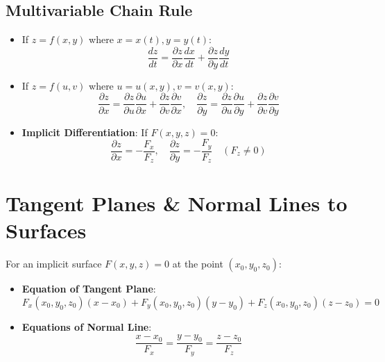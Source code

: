 \subsection{Multivariable Chain Rule}
\begin{itemize}[leftmargin=1.5em]
    \item If $z = f(x,y)$ where $x = x(t), y = y(t)$:
    \begin{equation}
        \frac{dz}{dt} = \frac{\partial z}{\partial x} \frac{dx}{dt} + \frac{\partial z}{\partial y} \frac{dy}{dt}
    \end{equation}
    \item If $z = f(u,v)$ where $u = u(x,y), v = v(x,y)$:
    \begin{equation}
        \frac{\partial z}{\partial x} = \frac{\partial z}{\partial u}\frac{\partial u}{\partial x} + \frac{\partial z}{\partial v}\frac{\partial v}{\partial x}, \quad \frac{\partial z}{\partial y} = \frac{\partial z}{\partial u}\frac{\partial u}{\partial y} + \frac{\partial z}{\partial v}\frac{\partial v}{\partial y}
    \end{equation}
    \item \textbf{Implicit Differentiation}: If $F(x,y,z) = 0$:
    \begin{equation}
        \frac{\partial z}{\partial x} = -\frac{F_x}{F_z}, \quad \frac{\partial z}{\partial y} = -\frac{F_y}{F_z} \quad (F_z \ne 0)
    \end{equation}
\end{itemize}

\section{Tangent Planes \& Normal Lines to Surfaces}

\begin{theorem}
For an implicit surface $F(x,y,z) = 0$ at the point $(x_0, y_0, z_0)$:
\begin{itemize}[leftmargin=1.5em]
    \item \textbf{Equation of Tangent Plane}:
    \begin{equation}
        F_x(x_0,y_0,z_0)(x - x_0) + F_y(x_0,y_0,z_0)(y - y_0) + F_z(x_0,y_0,z_0)(z - z_0) = 0
    \end{equation}
    \item \textbf{Equations of Normal Line}:
    \begin{equation}
        \frac{x - x_0}{F_x} = \frac{y - y_0}{F_y} = \frac{z - z_0}{F_z}
    \end{equation}
\end{itemize}
\end{theorem}

